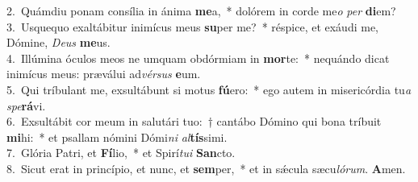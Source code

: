 {2.~}Quámdiu ponam consília in ánima \textbf{me}a,~* dolórem in corde me\textit{o} \textit{per} \textbf{di}em?\\
{3.~}Usquequo exaltábitur inimícus meus \textbf{su}per me?~* réspice, et exáudi me, Dómine, \textit{De}\textit{us} \textbf{me}us.\\
{4.~}Illúmina óculos meos ne umquam obdórmiam in \textbf{mor}te:~* nequándo dicat inimícus meus: præválui ad\textit{vér}\textit{sus} \textbf{e}um.\\
{5.~}Qui tríbulant me, exsultábunt si motus \textbf{fú}ero:~* ego autem in misericórdia tu\textit{a} \textit{spe}\textbf{rá}vi.\\
{6.~}Exsultábit cor meum in salutári tuo:~† cantábo Dómino qui bona tríbuit \textbf{mi}hi:~* et psallam nómini Dómi\textit{ni} \textit{al}\textbf{tís}simi.\\
{7.~}Glória Patri, et \textbf{Fí}lio,~* et Spirí\textit{tu}\textit{i} \textbf{San}cto.\\
{8.~}Sicut erat in princípio, et nunc, et \textbf{sem}per,~* et in sǽcula sæcu\textit{ló}\textit{rum}. \textbf{A}men.\\
